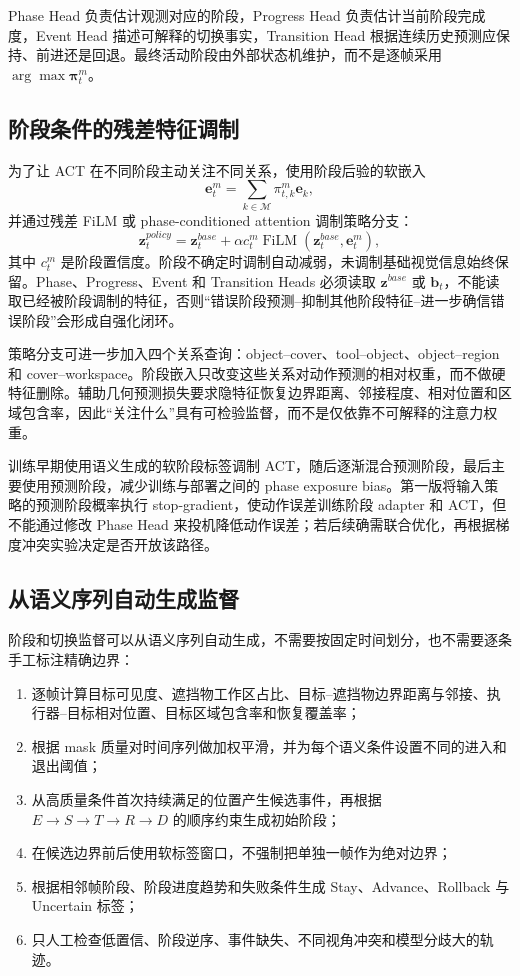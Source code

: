 \documentclass[UTF8,a4paper,11pt]{ctexart}
\begin{document}
Phase Head 负责估计观测对应的阶段，Progress Head 负责估计当前阶段完成度，Event Head 描述可解释的切换事实，Transition Head 根据连续历史预测应保持、前进还是回退。最终活动阶段由外部状态机维护，而不是逐帧采用 $\arg\max\bm\pi_t^m$。

\subsection{阶段条件的残差特征调制}

为了让 ACT 在不同阶段主动关注不同关系，使用阶段后验的软嵌入
\begin{equation}
\bm e_t^m=\sum_{k\in\mathcal M}\pi_{t,k}^{m}\bm e_k,
\end{equation}
并通过残差 FiLM 或 phase-conditioned attention 调制策略分支：
\begin{equation}
\bm z_t^{policy}=\bm z_t^{base}
+\alpha c_t^m\operatorname{FiLM}(\bm z_t^{base},\bm e_t^m),
\end{equation}
其中 $c_t^m$ 是阶段置信度。阶段不确定时调制自动减弱，未调制基础视觉信息始终保留。Phase、Progress、Event 和 Transition Heads 必须读取 $\bm z^{base}$ 或 $\bm b_t$，不能读取已经被阶段调制的特征，否则“错误阶段预测--抑制其他阶段特征--进一步确信错误阶段”会形成自强化闭环。

策略分支可进一步加入四个关系查询：object--cover、tool--object、object--region 和 cover--workspace。阶段嵌入只改变这些关系对动作预测的相对权重，而不做硬特征删除。辅助几何预测损失要求隐特征恢复边界距离、邻接程度、相对位置和区域包含率，因此“关注什么”具有可检验监督，而不是仅依靠不可解释的注意力权重。

训练早期使用语义生成的软阶段标签调制 ACT，随后逐渐混合预测阶段，最后主要使用预测阶段，减少训练与部署之间的 phase exposure bias。第一版将输入策略的预测阶段概率执行 stop-gradient，使动作误差训练阶段 adapter 和 ACT，但不能通过修改 Phase Head 来投机降低动作误差；若后续确需联合优化，再根据梯度冲突实验决定是否开放该路径。

\subsection{从语义序列自动生成监督}

阶段和切换监督可以从语义序列自动生成，不需要按固定时间划分，也不需要逐条手工标注精确边界：
\begin{enumerate}[leftmargin=2.3em]
  \item 逐帧计算目标可见度、遮挡物工作区占比、目标--遮挡物边界距离与邻接、执行器--目标相对位置、目标区域包含率和恢复覆盖率；
  \item 根据 mask 质量对时间序列做加权平滑，并为每个语义条件设置不同的进入和退出阈值；
  \item 从高质量条件首次持续满足的位置产生候选事件，再根据 $E\rightarrow S\rightarrow T\rightarrow R\rightarrow D$ 的顺序约束生成初始阶段；
  \item 在候选边界前后使用软标签窗口，不强制把单独一帧作为绝对边界；
  \item 根据相邻帧阶段、阶段进度趋势和失败条件生成 Stay、Advance、Rollback 与 Uncertain 标签；
  \item 只人工检查低置信、阶段逆序、事件缺失、不同视角冲突和模型分歧大的轨迹。
\end{enumerate}
\end{document}
